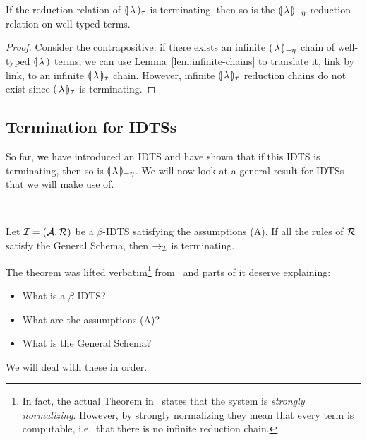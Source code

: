 \begin{lemma}\label{lem:banana-tau-termination}
  If the reduction relation of $\llparenthesis \, \lambda \, \rrparenthesis_\tau$ is terminating, then
  so is the ${\llparenthesis \, \lambda \, \rrparenthesis_{-\eta}}$ reduction relation on well-typed terms.
\end{lemma}

\begin{proof}
  Consider the contrapositive: if there exists an infinite ${\llparenthesis \, \lambda \, \rrparenthesis_{-\eta}}$ chain
  of well-typed $\llparenthesis \, \lambda \, \rrparenthesis$ terms, we can use
  Lemma~\ref{lem:infinite-chains} to translate it, link by link, to an
  infinite $\llparenthesis \, \lambda \, \rrparenthesis_\tau$ chain. However, infinite
  $\llparenthesis \, \lambda \, \rrparenthesis_\tau$ reduction chains do not exist since
  $\llparenthesis \, \lambda \, \rrparenthesis_\tau$ is terminating.
\end{proof}


\subsection{Termination for IDTSs}
\label{ssec:termination-for-idts}

So far, we have introduced an IDTS and have shown that if this IDTS is
terminating, then so is ${\llparenthesis \, \lambda \, \rrparenthesis_{-\eta}}$. We will now look at a general result
for IDTSs that we will make use of.

\begin{theorem}
  \label{thm:idts-normalization}
  ~\cite{blanqui2000termination}

  Let $\mathcal{I} = (\mathcal{A}, \mathcal{R})$ be a $\beta$-IDTS satisfying the assumptions
  (A). If all the rules of $\mathcal{R}$ satisfy the General Schema, then $\to_{\mathcal{I}}$
  is terminating.
\end{theorem}

The theorem was lifted verbatim\footnote{In fact, the actual Theorem
  in~\cite{blanqui2000termination} states that the system is \emph{strongly
    normalizing}. However, by strongly normalizing they mean that every
  term is computable, i.e.\ that there is no infinite reduction chain.}
from~\cite{blanqui2000termination} and parts of it deserve explaining:

\begin{itemize}
\item What is a $\beta$-IDTS?
\item What are the assumptions (A)?
\item What is the General Schema?
\end{itemize}

We will deal with these in order.

